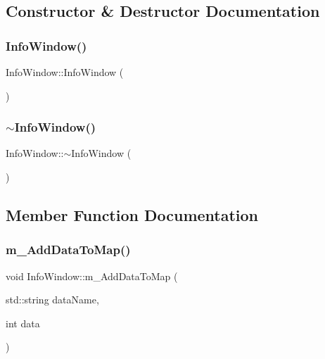 \subsection{Constructor \& Destructor Documentation}
\mbox{\label{class_info_window_a989cf8d93250fe17f944860b8efdd68d}} 
\subsubsection{\texorpdfstring{Info\+Window()}{InfoWindow()}}
{\footnotesize\ttfamily Info\+Window\+::\+Info\+Window (\begin{DoxyParamCaption}{ }\end{DoxyParamCaption})}

\mbox{\label{class_info_window_a41a3465e5db7d3ac6fa9627ff20fa241}} 
\subsubsection{\texorpdfstring{$\sim$\+Info\+Window()}{~InfoWindow()}}
{\footnotesize\ttfamily Info\+Window\+::$\sim$\+Info\+Window (\begin{DoxyParamCaption}{ }\end{DoxyParamCaption})}



\subsection{Member Function Documentation}
\mbox{\label{class_info_window_a1dc630a6d223bdc4bb672bd961f1622e}} 
\subsubsection{\texorpdfstring{m\+\_\+\+Add\+Data\+To\+Map()}{m\_AddDataToMap()}}
{\footnotesize\ttfamily void Info\+Window\+::m\+\_\+\+Add\+Data\+To\+Map (\begin{DoxyParamCaption}\item[{std\+::string}]{data\+Name,  }\item[{int}]{data }\end{DoxyParamCaption})}

